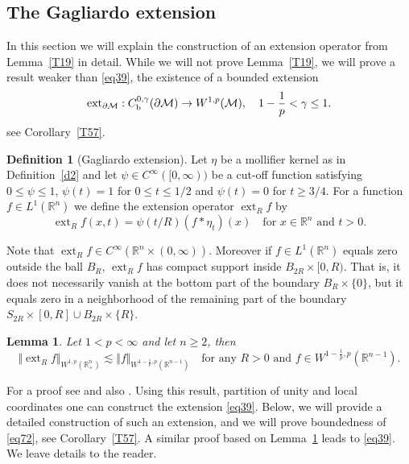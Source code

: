 \documentclass[intlimits,12pt,reqno]{amsart}
\newcommand{\cM}{\mathcal M}
\newcommand{\bbbr}{\mathbb R}
\newcommand{\R}{\mathbb R}
\numberwithin{equation}{section}
\def\ext{\operatorname{ext}}
\newtheorem{lemma}[theorem]{Lemma}
\theoremstyle{definition}
\newtheorem{definition}[theorem]{Definition}
\begin{document}
\subsection{The Gagliardo extension}
\label{S5}
In this section we will explain the construction of an extension operator from Lemma~\ref{T19} in detail.
While we will not prove Lemma~\ref{T19}, we will 
prove a result weaker than \eqref{eq39}, the existence of a bounded extension 
\begin{equation}
\label{eq72}
\ext_{\partial\cM}:C_{\rm b}^{0,\gamma}(\partial\cM)\to W^{1,p}(\cM),
\quad
1-\frac{1}{p}<\gamma\leq 1.
\end{equation}
see Corollary~\ref{T57}. 
\begin{definition}[Gagliardo extension]
\label{D4}
Let $\eta$ be a mollifier kernel as in Definition~\ref{d2} and let $\psi\in C^\infty([0,\infty))$ be a cut-off function
satisfying $0\leq\psi\leq 1$, $\psi(t)=1$ for $0\leq t\leq 1/2$ and $\psi(t)=0$ for $t\geq 3/4$.
For a function $f\in L^1(\bbbr^n)$  we define the extension operator $\ext_R f$ by
\begin{equation}
\label{eq36}
\ext_R f(x,t)=\psi(t/R)(f*\eta_t)(x)
\quad
\text{for $x\in \bbbr^n$ and $t>0$.}
\end{equation}
\end{definition}
Note that $\ext_Rf\in C^\infty(\bbbr^n\times(0,\infty))$. Moreover if $f\in L^1(\R^n)$ equals zero outside the ball $B_R$,
$\ext_Rf$ has compact support inside $B_{2R}\times[0,R)$. 
That is, it does not necessarily vanish at the bottom part of the boundary $B_R\times \{0\}$, but it equals zero in a neighborhood of
the remaining part of the boundary $S_{2R}\times[0,R]\cup B_{2R}\times\{R\}$.

\begin{lemma}
\label{T59}
Let $1<p<\infty$ and let $n\geq 2$, then
$$
\Vert \ext_R f\Vert_{W^{1,p}(\R^n_+)}\lesssim \Vert f\Vert_{W^{1-\frac{1}{p},p}(\R^{n-1})}
\quad
\text{for any $R>0$ and $f\in W^{1-\frac{1}{p},p}(\R^{n-1})$.}
$$
\end{lemma}
For a proof see \cite[Proposition~3.62]{demengel} and also \cite{leoni}.
Using this result, partition of unity and local coordinates one can construct the extension \eqref{eq39}. Below, we will provide a detailed construction of such an extension, and we will prove boundedness of \eqref{eq72},
see Corollary~\ref{T57}. A similar proof based on Lemma~\ref{T59} leads to \eqref{eq39}. We leave details to the reader.
\end{document}
